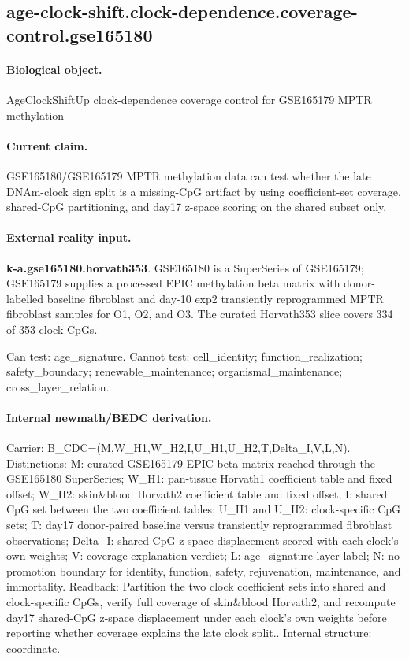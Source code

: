 \subsection{age-clock-shift.clock-dependence.coverage-control.gse165180}

\paragraph{Biological object.} AgeClockShiftUp clock-dependence coverage control for GSE165179 MPTR methylation

\paragraph{Current claim.} GSE165180/GSE165179 MPTR methylation data can test whether the late DNAm-clock sign split is a missing-CpG artifact by using coefficient-set coverage, shared-CpG partitioning, and day17 z-space scoring on the shared subset only.

\paragraph{External reality input.}
\textbf{k-a.gse165180.horvath353}. GSE165180 is a SuperSeries of GSE165179; GSE165179 supplies a processed EPIC methylation beta matrix with donor-labelled baseline fibroblast and day-10 exp2 transiently reprogrammed MPTR fibroblast samples for O1, O2, and O3. The curated Horvath353 slice covers 334 of 353 clock CpGs.

Can test: age\_signature. Cannot test: cell\_identity; function\_realization; safety\_boundary; renewable\_maintenance; organismal\_maintenance; cross\_layer\_relation.

\paragraph{Internal newmath/BEDC derivation.} Carrier: B\_CDC=(M,W\_H1,W\_H2,I,U\_H1,U\_H2,T,Delta\_I,V,L,N). Distinctions: M: curated GSE165179 EPIC beta matrix reached through the GSE165180 SuperSeries; W\_H1: pan-tissue Horvath1 coefficient table and fixed offset; W\_H2: skin\&blood Horvath2 coefficient table and fixed offset; I: shared CpG set between the two coefficient tables; U\_H1 and U\_H2: clock-specific CpG sets; T: day17 donor-paired baseline versus transiently reprogrammed fibroblast observations; Delta\_I: shared-CpG z-space displacement scored with each clock's own weights; V: coverage explanation verdict; L: age\_signature layer label; N: no-promotion boundary for identity, function, safety, rejuvenation, maintenance, and immortality. Readback: Partition the two clock coefficient sets into shared and clock-specific CpGs, verify full coverage of skin\&blood Horvath2, and recompute day17 shared-CpG z-space displacement under each clock's own weights before reporting whether coverage explains the late clock split.. Internal structure: coordinate.

